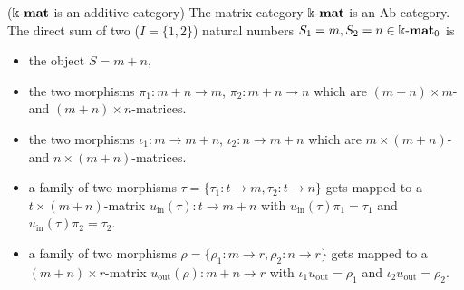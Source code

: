 \begin{example}{($\Bbbk\textnormal{-}\mathbf{mat}$ is an additive category)}\label{ex:kmat_has_direct_sums}
The matrix category $\Bbbk\textnormal{-}\mathbf{mat}$ is an Ab-category. The direct sum of two ($I = \{1,2\}$) natural numbers $S_{1} = m, S_{2} = n \in \Bbbk\textnormal{-}\mathbf{mat}_{0}$ is
\begin{itemize}
\item the object $S = m+n$,
\item the two morphisms $\pi_{1} : m+n \rightarrow m$, $\pi_{2} : m+n \rightarrow n$ which are $(m+n) \times m$- and $(m+n) \times n$-matrices.
\item the two morphisms $\iota_{1} : m \rightarrow m+n$, $\iota_{2} : n \rightarrow m+n$ which are $m \times (m+n)$- and $n \times (m+n)$-matrices.
\item a family of two morphisms $\tau = \{ \tau_{1} : t \rightarrow m, \tau_{2} : t \rightarrow n\}$ gets mapped to a $t \times (m+n)$-matrix
$u_{\text{in}}(\tau) : t \rightarrow m+n$ with $u_{\text{in}}(\tau) \pi_{1} = \tau_{1}$ and $u_{\text{in}}(\tau) \pi_{2} = \tau_{2}$.
\item a family of two morphisms $\rho = \{ \rho_{1} : m \rightarrow r, \rho_{2} : n \rightarrow r \}$ gets mapped to a $(m+n) \times r$-matrix
$u_{\text{out}}(\rho) : m+n \rightarrow r$ with $\iota_{1} u_{\text{out}} = \rho_{1}$ and $\iota_{2} u_{\text{out}} = \rho_{2}$.
\end{itemize}
\end{example}

